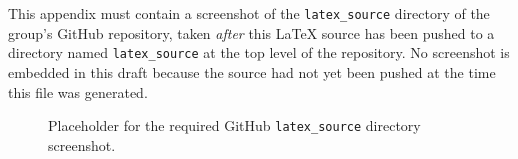 \documentclass[conference]{IEEEtran}
\begin{document}
\clearpage
\appendix[Appendix A]
This appendix must contain a screenshot of the \texttt{latex\_source} directory of the group's GitHub repository, taken \emph{after} this LaTeX source has been pushed to a directory named \texttt{latex\_source} at the top level of the repository. No screenshot is embedded in this draft because the source had not yet been pushed at the time this file was generated.

\begin{figure}[htbp]
\centering
{}
\caption{Placeholder for the required GitHub \texttt{latex\_source} directory screenshot.}
\label{fig:appendix}
\end{figure}

\clearpage


\end{document}
